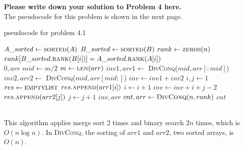 \documentclass[11pt,twoside]{article}
\newenvironment{solution}{{\par\noindent\it Solution.}}{}
\begin{document}
\begin{solution}
\textbf{Please write down your solution to Problem 4 here.}\\
The pseudocode for this problem is shown in the next page.\\
\begin{algorithm}
    \caption{pseudocode for problem 4.1}
    \begin{algorithmic}
            \State $A\_sorted \gets \textsc{sorted}(A)$ 
            \State $B\_sorted \gets \textsc{sorted}(B)$ 
            \State $rank \gets \textsc{zeros}(n)$ 
                \State $rank[B\_sorted.\textsc{rank}(B[i])]=A\_sorted.\textsc{rank}(A[i])$\\
            \EndFor
                    \State \Return $0, arr$
                \EndIf
                \State $mid \gets m/2$
                \State $m \gets \textsc{len}(arr)$
                \State $inv1, arr1 \gets$ \textsc{DivConq}($mid, arr[:mid]$)
                \State $inv2, arr2 \gets$ \textsc{DivConq}($mid, arr[mid:]$)
                \State $inv \gets inv1+inv2$
                \State $i,j \gets 1$
                \State $res \gets \textsc{emptylist}$
                        \State $res.\textsc{append}(arr1[i])$
                        \State $i \gets i+1$
                        \State $inv \gets inv+i+j-2$
                    \Else
                        \State $res.\textsc{append}(arr2[j])$
                        \State $j \gets j+1$
                    \EndIf
                \EndWhile
                \State \Return $inv, arr$
            \EndProcedure
            \State $cnt, arr \gets \textsc{DivConq}(n, rank)$
            \State \Return $cnt$
        \EndProcedure     
    \end{algorithmic}
\end{algorithm}\\
This algorithm applies merge sort 2 times and binary search $2n$ times, which is $O(n\log{n})$.
In \textsc{DivConq}, the sorting of $arr1$ and $arr2$, two sorted arrays, is $O(n)$. 

\end{solution}
\end{document}
